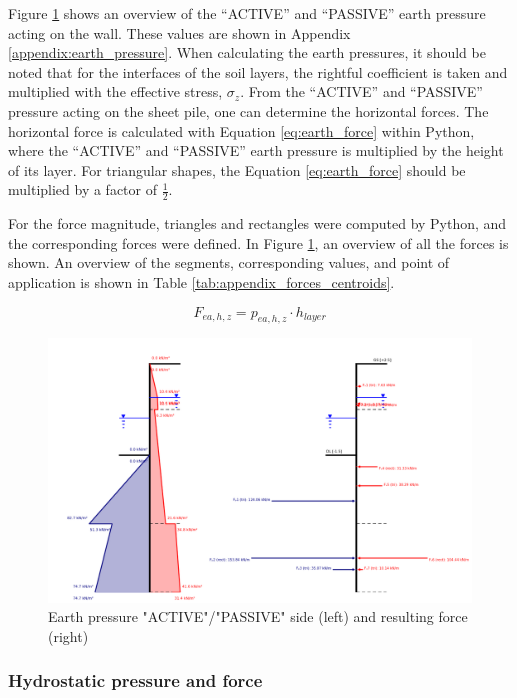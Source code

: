 Figure \ref{fig:earth_pressure} shows an overview of the “ACTIVE” and “PASSIVE” earth pressure acting on the wall. These values are shown in Appendix \ref{appendix:earth_pressure}. When calculating the earth pressures, it should be noted that for the interfaces of the soil layers, the rightful coefficient is taken and multiplied with the effective stress, $\sigma_{z}$. From the “ACTIVE” and “PASSIVE” pressure acting on the sheet pile, one can determine the horizontal forces. The horizontal force is calculated with Equation \ref{eq:earth_force} within Python, where the “ACTIVE” and “PASSIVE” earth pressure is multiplied by the height of its layer. For triangular shapes, the Equation \ref{eq:earth_force} should be multiplied by a factor of $\frac{1}{2}$.

For the force magnitude, triangles and rectangles were computed by Python, and the corresponding forces were defined. In Figure \ref{fig:earth_pressure}, an overview of all the forces is shown. An overview of the segments, corresponding values, and point of application is shown in Table \ref{tab:appendix_forces_centroids}.

\begin{equation}
    F_{ea,h,z} = p_{ea,h,z} \cdot h_{layer}
    \label{eq:earth_force}
\end{equation}

\begin{figure}[H]
    \centering
    \includegraphics[width=0.75\linewidth]{figures/ch8/earth_pressure_force.png}
    \caption{Earth pressure "ACTIVE"/"PASSIVE" side (left) and resulting force (right)}
    \label{fig:earth_pressure}
\end{figure}

\newpage

\subsubsection{Hydrostatic pressure and force}

